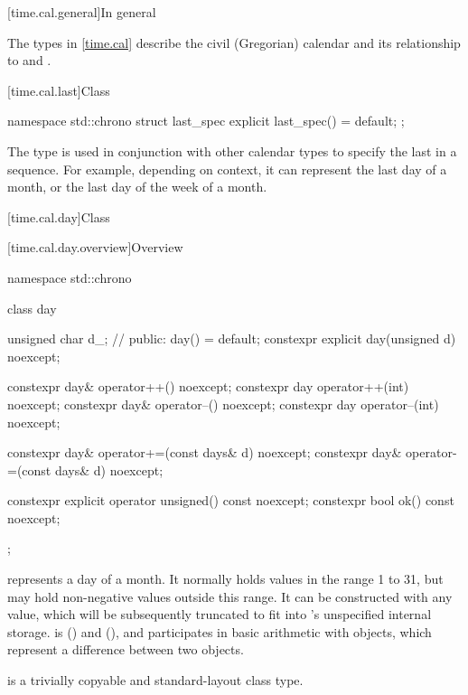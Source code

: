 [time.cal.general]{In general}

\pnum
The types in \ref{time.cal} describe the civil (Gregorian) calendar
and its relationship to  and .

[time.cal.last]{Class }
%

\begin{codeblock}
namespace std::chrono {
  struct last_spec {
    explicit last_spec() = default;
  };
}
\end{codeblock}

\pnum
The type  is used
in conjunction with other calendar types
to specify the last in a sequence.
For example, depending on context,
it can represent the last day of a month,
or the last day of the week of a month.

[time.cal.day]{Class }

[time.cal.day.overview]{Overview}

\begin{codeblock}
namespace std::chrono {
  class day {
    unsigned char d_;           // \expos
  public:
    day() = default;
    constexpr explicit day(unsigned d) noexcept;

    constexpr day& operator++()    noexcept;
    constexpr day  operator++(int) noexcept;
    constexpr day& operator--()    noexcept;
    constexpr day  operator--(int) noexcept;

    constexpr day& operator+=(const days& d) noexcept;
    constexpr day& operator-=(const days& d) noexcept;

    constexpr explicit operator unsigned() const noexcept;
    constexpr bool ok() const noexcept;
  };
}
\end{codeblock}

\pnum
{} represents a day of a month.
It normally holds values in the range 1 to 31,
but may hold non-negative values outside this range.
It can be constructed with any  value,
which will be subsequently truncated to fit into 's unspecified internal storage.
 is  ()
and  (),
and participates in basic arithmetic with  objects,
which represent a difference between two  objects.

\pnum
{} is a trivially copyable and standard-layout class type.

